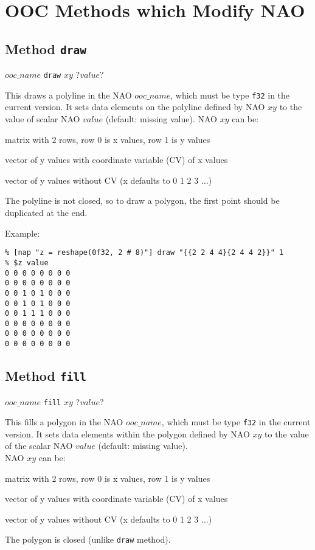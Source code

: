 
\section{OOC Methods which Modify NAO}

\subsection{Method \texttt{draw}}
    \label{ooc-modify-draw}

$ooc\_name$ \texttt{draw} $xy$ ?$value$?

This draws a polyline in the NAO 
  $ooc\_name$, which must be type 
  \texttt{f32} in the current version. It sets data elements on the
  polyline defined by NAO 
  $xy$ to the value of scalar NAO 
  $value$ (default: missing value). NAO 
  $xy$ can be:
\begin{bullets}
    \item matrix with 2 rows, row 0 is x values, row 1 is y values
    \item vector of y values with coordinate variable (CV) of x
    values
    \item vector of y values without CV (x defaults to 0 1 2 3 $\ldots$)
\end{bullets}
The polyline is not closed, so to draw a polygon, the first point should be duplicated at the end.

Example:
\begin{verbatim}
% [nap "z = reshape(0f32, 2 # 8)"] draw "{{2 2 4 4}{2 4 4 2}}" 1
% $z value
0 0 0 0 0 0 0 0
0 0 0 0 0 0 0 0
0 0 1 0 1 0 0 0
0 0 1 0 1 0 0 0
0 0 1 1 1 0 0 0
0 0 0 0 0 0 0 0
0 0 0 0 0 0 0 0
0 0 0 0 0 0 0 0
\end{verbatim}

\subsection{Method \texttt{fill}}
    \label{ooc-modify-fill}

$ooc\_name$ \texttt{fill} $xy$ ?$value$?

This fills a polygon in the NAO 
  $ooc\_name$, which must be type 
  \texttt{f32} in the current version. It sets data elements within
  the polygon defined by NAO 
  $xy$ to the value of the scalar NAO 
  $value$ (default: missing value).
  \\NAO 
  $xy$ can be:
\begin{bullets}
    \item matrix with 2 rows, row 0 is x values, row 1 is y values
    \item vector of y values with coordinate variable (CV) of x
    values
    \item vector of y values without CV (x defaults to 0 1 2 3 $\ldots$)
\end{bullets}
The polygon is closed (unlike \texttt{draw} method).

